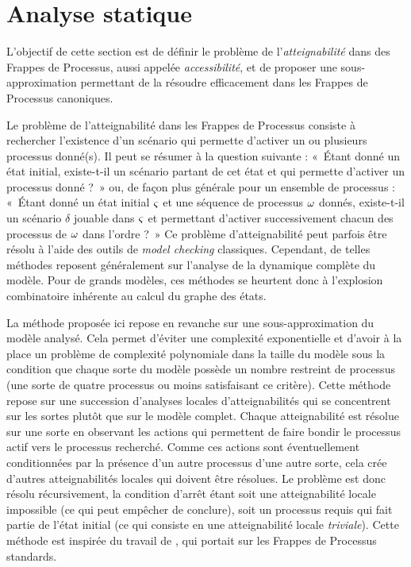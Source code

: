 
\section{Analyse statique}

L'objectif de cette section est de définir le problème de l'\emph{atteignabilité} dans des
Frappes de Processus,
aussi appelée \emph{accessibilité},
et de proposer une sous-approximation permettant de la résoudre efficacement
dans les Frappes de Processus canoniques.

\myskip

Le problème de l'atteignabilité dans les Frappes de Processus consiste à rechercher l'existence
d'un scénario qui permette d'activer un ou plusieurs processus donné(s).
Il peut se résumer à la question suivante :
«~Étant donné un état initial, existe-t-il un scénario partant de cet état et
qui permette d'activer un processus donné ?~»
ou, de façon plus générale pour un ensemble de processus :
«~Étant donné un état initial $\varsigma$ et une séquence de processus $\omega$ donnés,
existe-t-il un scénario $\delta$ jouable dans $\varsigma$ et permettant d'activer successivement
chacun des processus de $\omega$ dans l'ordre ?~»
Ce problème d'atteignabilité peut parfois être résolu à l'aide des outils
de \textit{model checking} classiques.
Cependant, de telles méthodes reposent généralement sur l'analyse de la dynamique complète
du modèle.
Pour de grands modèles, ces méthodes se heurtent donc à l'explosion combinatoire inhérente
au calcul du graphe des états.

La méthode proposée ici repose en revanche sur une sous-approximation du modèle analysé.
Cela permet d'éviter une complexité exponentielle
et d'avoir à la place un problème de complexité polynomiale dans la taille du modèle
sous la condition que chaque sorte du modèle possède un nombre restreint de processus
(une sorte de quatre processus ou moins satisfaisant ce critère).
Cette méthode repose sur une succession d'analyses locales d'atteignabilités
qui se concentrent sur les sortes plutôt que sur le modèle complet.
Chaque atteignabilité est résolue sur une sorte en observant les actions qui permettent
de faire bondir le processus actif vers le processus recherché.
Comme ces actions sont éventuellement conditionnées par la présence d'un autre processus
d'une autre sorte, cela crée d'autres atteignabilités locales qui doivent être résolues.
Le problème est donc résolu récursivement, la condition d'arrêt étant soit
une atteignabilité locale impossible (ce qui peut empêcher de conclure),
soit un processus requis qui fait partie de l'état initial (ce qui consiste en une
atteignabilité locale \emph{triviale}).
Cette méthode est inspirée du travail de ,
qui portait sur les Frappes de Processus standards.

